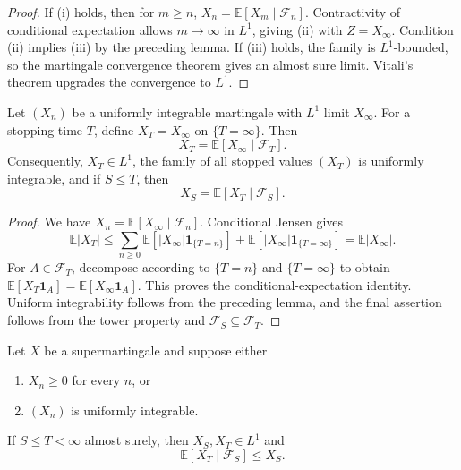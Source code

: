 \begin{proof}
If (i) holds, then for $m\geq n$,
$X_n=\mathbb E[X_m\mid\mathcal F_n]$. Contractivity of conditional
expectation allows $m\to\infty$ in $L^1$, giving (ii) with $Z=X_\infty$.
Condition (ii) implies (iii) by the preceding lemma. If (iii) holds, the
family is $L^1$-bounded, so the martingale convergence theorem gives an almost
sure limit. Vitali's theorem upgrades the convergence to $L^1$.
\end{proof}

\begin{thm}
Let $(X_n)$ be a uniformly integrable martingale with $L^1$ limit
$X_\infty$. For a stopping time $T$, define $X_T=X_\infty$ on
$\{T=\infty\}$. Then
\[
X_T=\mathbb E[X_\infty\mid\mathcal F_T].
\]
Consequently, $X_T\in L^1$, the family of all stopped values $(X_T)$ is
uniformly integrable, and if $S\leq T$, then
\[
X_S=\mathbb E[X_T\mid\mathcal F_S].
\]
\end{thm}

\begin{proof}
We have $X_n=\mathbb E[X_\infty\mid\mathcal F_n]$. Conditional Jensen gives
\[
\mathbb E|X_T|
 \leq\sum_{n\geq0}
 \mathbb E[|X_\infty|\mathbf1_{\{T=n\}}]
 +\mathbb E[|X_\infty|\mathbf1_{\{T=\infty\}}]
 =\mathbb E|X_\infty|.
\]
For $A\in\mathcal F_T$, decompose according to $\{T=n\}$ and
$\{T=\infty\}$ to obtain
$\mathbb E[X_T\mathbf1_A]=\mathbb E[X_\infty\mathbf1_A]$. This proves the
conditional-expectation identity. Uniform integrability follows from the
preceding lemma, and the final assertion follows from the tower property and
$\mathcal F_S\subseteq\mathcal F_T$.
\end{proof}

\begin{thm}
Let $X$ be a supermartingale and suppose either
\begin{enumerate}[label=(\alph*)]
  \item $X_n\geq0$ for every $n$, or
  \item $(X_n)$ is uniformly integrable.
\end{enumerate}
If $S\leq T<\infty$ almost surely, then $X_S,X_T\in L^1$ and
\[
\mathbb E[X_T\mid\mathcal F_S]\leq X_S.
\]
\end{thm}

